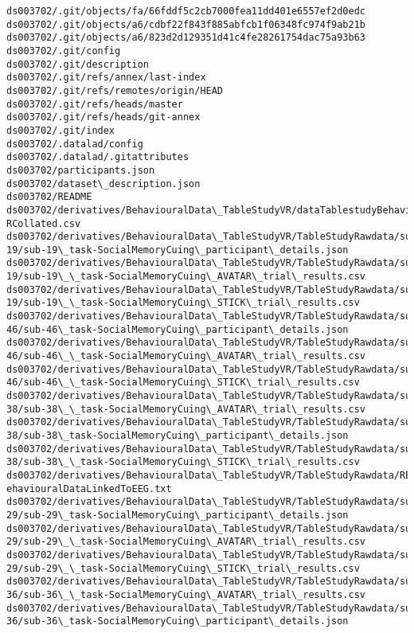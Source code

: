 \documentclass[11pt]{article}
\begin{document}
\begin{Verbatim}[commandchars=\\\{\}]
ds003702/.git/objects/fa/66fddf5c2cb7000fea11dd401e6557ef2d0edc
ds003702/.git/objects/a6/cdbf22f843f885abfcb1f06348fc974f9ab21b
ds003702/.git/objects/a6/823d2d129351d41c4fe28261754dac75a93b63
ds003702/.git/config
ds003702/.git/description
ds003702/.git/refs/annex/last-index
ds003702/.git/refs/remotes/origin/HEAD
ds003702/.git/refs/heads/master
ds003702/.git/refs/heads/git-annex
ds003702/.git/index
ds003702/.datalad/config
ds003702/.datalad/.gitattributes
ds003702/participants.json
ds003702/dataset\_description.json
ds003702/README
ds003702/derivatives/BehaviouralData\_TableStudyVR/dataTablestudyBehaviouralV
RCollated.csv
ds003702/derivatives/BehaviouralData\_TableStudyVR/TableStudyRawdata/sub-
19/sub-19\_task-SocialMemoryCuing\_participant\_details.json
ds003702/derivatives/BehaviouralData\_TableStudyVR/TableStudyRawdata/sub-
19/sub-19\_\_task-SocialMemoryCuing\_AVATAR\_trial\_results.csv
ds003702/derivatives/BehaviouralData\_TableStudyVR/TableStudyRawdata/sub-
19/sub-19\_\_task-SocialMemoryCuing\_STICK\_trial\_results.csv
ds003702/derivatives/BehaviouralData\_TableStudyVR/TableStudyRawdata/sub-
46/sub-46\_task-SocialMemoryCuing\_participant\_details.json
ds003702/derivatives/BehaviouralData\_TableStudyVR/TableStudyRawdata/sub-
46/sub-46\_\_task-SocialMemoryCuing\_AVATAR\_trial\_results.csv
ds003702/derivatives/BehaviouralData\_TableStudyVR/TableStudyRawdata/sub-
46/sub-46\_\_task-SocialMemoryCuing\_STICK\_trial\_results.csv
ds003702/derivatives/BehaviouralData\_TableStudyVR/TableStudyRawdata/sub-
38/sub-38\_\_task-SocialMemoryCuing\_AVATAR\_trial\_results.csv
ds003702/derivatives/BehaviouralData\_TableStudyVR/TableStudyRawdata/sub-
38/sub-38\_task-SocialMemoryCuing\_participant\_details.json
ds003702/derivatives/BehaviouralData\_TableStudyVR/TableStudyRawdata/sub-
38/sub-38\_\_task-SocialMemoryCuing\_STICK\_trial\_results.csv
ds003702/derivatives/BehaviouralData\_TableStudyVR/TableStudyRawdata/README\_B
ehaviouralDataLinkedToEEG.txt
ds003702/derivatives/BehaviouralData\_TableStudyVR/TableStudyRawdata/sub-
29/sub-29\_task-SocialMemoryCuing\_participant\_details.json
ds003702/derivatives/BehaviouralData\_TableStudyVR/TableStudyRawdata/sub-
29/sub-29\_\_task-SocialMemoryCuing\_AVATAR\_trial\_results.csv
ds003702/derivatives/BehaviouralData\_TableStudyVR/TableStudyRawdata/sub-
29/sub-29\_\_task-SocialMemoryCuing\_STICK\_trial\_results.csv
ds003702/derivatives/BehaviouralData\_TableStudyVR/TableStudyRawdata/sub-
36/sub-36\_\_task-SocialMemoryCuing\_AVATAR\_trial\_results.csv
ds003702/derivatives/BehaviouralData\_TableStudyVR/TableStudyRawdata/sub-
36/sub-36\_task-SocialMemoryCuing\_participant\_details.json

\end{Verbatim}
\end{document}
